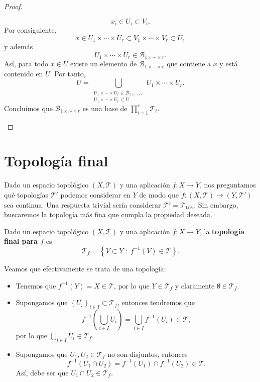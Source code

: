 \begin{proof}
\begin{enumerate}
\[x_i\in U_i\subset V_i.\]
Por consiguiente,
\[x\in U_1\times\cdots\times U_r\subset V_1\times\cdots\times V_r
\subset U,\]
y además
\[U_1\times\cdots\times U_r\in\mathcal{B}_{1\times\cdots\times r}.\]
Así, para todo $x\in U$ existe un elemento de $\mathcal{B}_{1\times\cdots\times r}$ que contiene a $x$ y está contenido en $U$. Por tanto,
\[U=\bigcup_{\substack{U_1\times\cdots\times U_r\in\mathcal{B}_{1\times\cdots\times r}\\ U_1\times\cdots\times U_r\subset U}}U_1\times\cdots\times U_r.\]
Concluimos que $\mathcal{B}_{1\times\cdots\times r}$ es una base de
$\displaystyle \prod^{r}_{i = 1}\mathcal{T}_{i} $. 
	\end{enumerate}
\end{proof}

\section{Topología final}
Dado un espacio topológico $\displaystyle \left(X, \mathcal{T}\right) $ y una aplicación $\displaystyle f : X \to Y $, nos preguntamos qué topologías $\displaystyle \mathcal{T}' $ podemos considerar en $\displaystyle Y $ de modo que $\displaystyle f : \left(X, \mathcal{T}\right)\to \left(Y, \mathcal{T}'\right) $ sea continua. Una respuesta trivial sería considerar $\displaystyle \mathcal{T}' = \mathcal{T}_{\text{triv}} $. Sin embargo, buscaremos la topología más fina que cumpla la propiedad deseada.
\begin{definition}
Dado un espacio topológico $\displaystyle \left(X, \mathcal{T}\right) $ y una aplicación $\displaystyle f : X \to Y $, la \textbf{topología final para $\displaystyle f $} es
\[\mathcal{T}_{f} = \left\{ V \subset Y \; : \; f^{-1}\left(V\right)\in \mathcal{T}\right\}  .\]
\end{definition}
Veamos que efectivamente se trata de una topología:
\begin{itemize}
\item Tenemos que $\displaystyle f^{-1}\left(Y\right)= X \in \mathcal{T} $, por lo que $\displaystyle Y \in \mathcal{T}_{f} $ y claramente $\displaystyle \emptyset \in \mathcal{T}_{f} $. 
\item Supongamos que $\displaystyle \left\{ U_{i}\right\} _{i \in I}\subset \mathcal{T}_{f} $, entonces tendremos que 
	\[f^{-1}\left(\bigcup_{i \in I}U_{i}\right)=\bigcup_{i \in I}f^{-1}\left(U_{i}\right)\in \mathcal{T} ,\]
	por lo que $\displaystyle \bigcup_{i \in I}U_{i}\in \mathcal{T}_{f} $. 
\item Supongamos que $\displaystyle U_{1}, U_{2}\in \mathcal{T}_{f} $ no son disjuntos, entonces
	\[f^{-1}\left(U_{1} \cap U_{2}\right)=f^{-1}\left(U_{1}\right) \cap f^{-1}\left(U_{2}\right)\in \mathcal{T} .\]
	Así, debe ser que $\displaystyle U_{1} \cap U_{2} \in \mathcal{T}_{f} $. 
\end{itemize}
